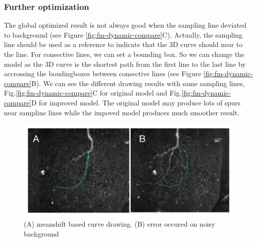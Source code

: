 \subsubsection{Further optimization}
The global optimized result is not always good when the sampling line deviated to background (see Figure \ref{fig:fm-dynamic-compare}C). Actually, the sampling line should be used as a reference to indicate that the 3D curve should near to the line. For consective lines, we can set a bounding box. So we can change the model as the 3D curve is the shortest path from the first line to the last line by accrossing the boudingboxes between consective lines (see Figure \ref{fig:fm-dynamic-compare}B). We can see the different drawing results with same sampling lines, Fig.\ref{fig:fm-dynamic-compare}C for original model and Fig.\ref{fig:fm-dynamic-compare}D for improved model. The original model may produce lots of spurs near sampline lines while the impoved model produces much smoother result.

\begin{figure}[htb]
\begin{center}
\includegraphics[width=5in]{images/fm_meanshift_drawing}
\caption{(A) meanshift based curve drawing. (B) error occured on noisy background}
\label{fig:fm-meanshift-drawing} %
\end{center}
\end{figure}

